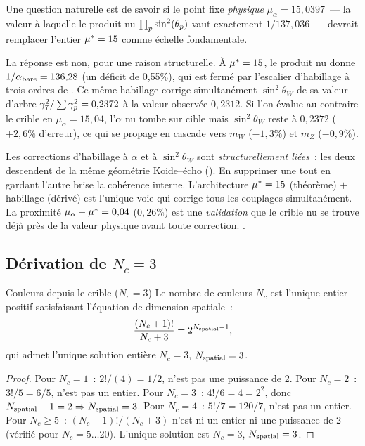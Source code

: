 \documentclass[12pt,a4paper]{article}
\begin{document}
\begin{remarque}[Pourquoi $\mustar = 15$, et non $\mu_\alpha = 15{,}04$]
\label{rem:mu15_vs_mualpha}
Une question naturelle est de savoir si le point fixe \emph{physique}
$\mu_\alpha = 15{,}0397$~--- la valeur à laquelle le produit nu
$\prod_p \sin^2(\theta_{p})$ vaut exactement $1/137{,}036$~--- devrait
remplacer l'entier $\mustar = 15$ comme échelle fondamentale.

La réponse est non, pour une raison structurelle. À $\mustar = 15$,
le produit nu donne $1/\alpha_{\rm bare} = 136{,}28$ (un déficit
de 0{,}55\%), qui est fermé par l'escalier d'habillage à trois
ordres de \cite{companion_physics}. Ce même habillage corrige
simultanément $\sin^2\!\theta_W$ de sa valeur d'arbre
$\gamma_{7}^2/\sum \gamma_{p}^2 = 0{,}2372$ à la valeur observée
$0{,}2312$. Si l'on évalue au contraire le crible en
$\mu_\alpha = 15{,}04$, l'$\alpha$ nu tombe sur cible mais
$\sin^2\!\theta_W$ reste à $0{,}2372$ ($+2{,}6\%$ d'erreur), ce qui
se propage en cascade vers $m_W$ ($-1{,}3\%$) et $m_Z$ ($-0{,}9\%$).

Les corrections d'habillage à $\alpha$ et à $\sin^2\!\theta_W$ sont
\emph{structurellement liées}~: les deux descendent de la même
géométrie Koide--écho (\cite{companion_physics}). En supprimer
une tout en gardant l'autre brise la cohérence interne.
L'architecture $\mustar = 15$ (théorème) $+$ habillage (dérivé) est
l'unique voie qui corrige tous les couplages simultanément. La
proximité $\mu_\alpha - {\mu^{*}} = 0{,}04$ ($0{,}26\%$) est une
\emph{validation} que le crible nu se trouve déjà près de la
valeur physique avant toute correction. \VALTAG.
\end{remarque}

\subsection{Dérivation de \texorpdfstring{$N_c = 3$}{Nc=3}}
\label{sec:ch8_Nc}

\begin{thmbox}{Couleurs depuis le crible ($N_c = 3$)}
\label{thm:Nc}
Le nombre de couleurs $N_c$ est l'unique entier positif satisfaisant
l'équation de dimension spatiale~:
\begin{equation}
  \frac{(N_c + 1)!}{N_c + 3} = 2^{N_{\rm spatial} - 1},
  \label{eq:Nc_equation:ch08}
\end{equation}
qui admet l'unique solution entière $N_c = 3$, $N_{\rm spatial} = 3$.

\begin{proof}
Pour $N_c = 1$~: $2!/(4) = 1/2$, n'est pas une puissance de 2.
Pour $N_c = 2$~: $3!/5 = 6/5$, n'est pas un entier.
Pour $N_c = 3$~: $4!/6 = 4 = 2^2$, donc
$N_{\rm spatial} - 1 = 2 \Rightarrow N_{\rm spatial} = 3$.
Pour $N_c = 4$~: $5!/7 = 120/7$, n'est pas un entier.
Pour $N_c \geq 5$~: $(N_c + 1)!/(N_c + 3)$ n'est ni un entier ni
une puissance de 2 (vérifié pour $N_c = 5\ldots 20$).
L'unique solution est $N_c = 3$, $N_{\rm spatial} = 3$.
\end{proof}
\end{thmbox}
\end{document}
